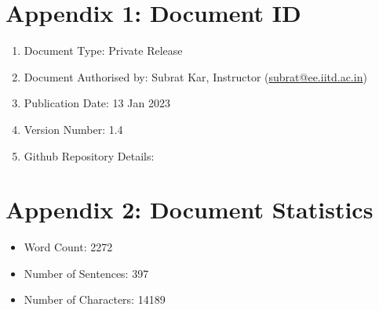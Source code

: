 \documentclass[12pt]{article} %
\begin{document}
\section*{}
\printglossary

\newpage

\printindex
\newpage

\begin{appendices}
\section{Appendix 1: Document ID}
   \begin{enumerate}
       \item Document Type: Private Release 
       \item Document Authorised by: Subrat Kar, Instructor (\href{mailto:subrat@ee.iitd.ac.in}{subrat@ee.iitd.ac.in})
       \item Publication Date: 13 Jan 2023
       \item Version Number: 1.4
       \item Github Repository Details:
   \end{enumerate}

\section{Appendix 2: Document Statistics}
    \begin{itemize}
       \item Word Count: 2272
       \item Number of Sentences: 397
       \item Number of Characters: 14189
    \end{itemize}
    

\end{appendices}
\end{document}
